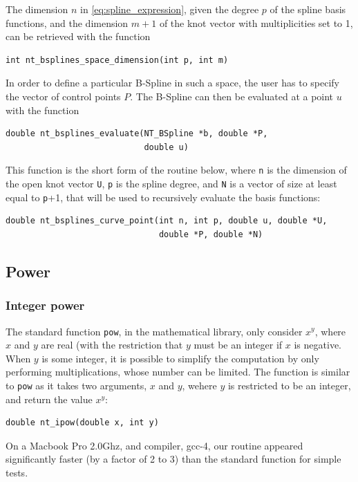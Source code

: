 The dimension $n$ in \eqref{eq:spline_expression}, 
given the degree $p$ of the spline basis functions, and the dimension $m+1$ of the knot vector
with multiplicities set to 1, can be retrieved with the function
\begin{verbatim}
int nt_bsplines_space_dimension(int p, int m)
\end{verbatim}

In order to define a particular B-Spline in such a space, the user has to specify the vector of control
points $P$.
The B-Spline can then be evaluated at a point $u$ with the function
\begin{verbatim}
double nt_bsplines_evaluate(NT_BSpline *b, double *P,
                            double u)
\end{verbatim}
This function is the short form of the routine below, where \verb|n| is the dimension of the open knot vector \verb|U|, \verb|p| is the spline degree, and \verb|N| is a vector of size at least equal to \verb|p|+1, that will be used to recursively evaluate the basis functions:
\begin{verbatim}
double nt_bsplines_curve_point(int n, int p, double u, double *U,
                               double *P, double *N)
\end{verbatim}




\subsection{Power}

\subsubsection{Integer power}

The standard function \verb|pow|, in the mathematical library, only consider $x^y$, where $x$ and $y$ are real (with the restriction that $y$ must be an integer if $x$ is negative.
When $y$ is some integer, it is possible to simplify the computation
by only performing multiplications, whose number can be limited.
The function is similar to \verb|pow| as it takes two arguments, $x$ and $y$, wehere $y$ is restricted to be an integer, and return the value $x^y$:
\begin{verbatim}
double nt_ipow(double x, int y)
\end{verbatim}
On a Macbook Pro 2.0Ghz, and compiler, gcc-4, our routine appeared
significantly faster (by a factor of 2 to 3) than the standard
function for simple tests.

